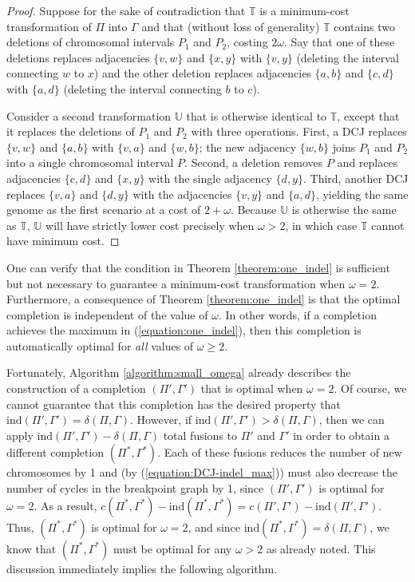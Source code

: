 \begin{proof}
Suppose for the sake of contradiction that $\mathbb{T}$ is a minimum-cost transformation of $\Pi$ into $\Gamma$ and that (without loss of generality) $\mathbb{T}$ contains two deletions of chromosomal intervals $P_1$ and $P_2$, costing $2\omega$.  Say that one of these deletions replaces adjacencies $\{v, w\}$ and $\{x, y\}$ with $\{v, y\}$ (deleting the interval connecting $w$ to $x$)  and the other deletion replaces adjacencies $\{a, b\}$ and $\{c, d\}$ with $\{a, d\}$ (deleting the interval connecting $b$ to $c$).

Consider a second transformation $\mathbb{U}$ that is otherwise identical to $\mathbb{T}$, except that it replaces the deletions of $P_1$ and $P_2$ with three operations.  First, a DCJ replaces $\{v, w\}$ and $\{a, b\}$ with $\{v, a\}$ and $\{w, b\}$; the new adjacency $\{w, b\}$ joins $P_1$ and $P_2$ into a single chromosomal interval $P$.  Second, a deletion removes $P$ and replaces adjacencies $\{c, d\}$ and $\{x, y\}$ with the single adjacency $\{d, y\}$.  Third, another DCJ replaces $\{v, a\}$ and $\{d, y\}$ with the adjacencies $\{v, y\}$ and $\{a, d\}$, yielding the same genome as the first scenario at a cost of $2 + \omega$.  Because $\mathbb{U}$ is otherwise the same as $\mathbb{T}$, $\mathbb{U}$ will have strictly lower cost precisely when $\omega > 2$, in which case $\mathbb{T}$ cannot have minimum cost.
\end{proof}

\noindent One can verify that the condition in Theorem \ref{theorem:one_indel} is sufficient but not necessary to guarantee a minimum-cost transformation when $\omega = 2$.  Furthermore, a consequence of Theorem \ref{theorem:one_indel} is that the optimal completion is independent of the value of $\omega$.  In other words, if a completion achieves the maximum in (\ref{equation:one_indel}), then this completion is automatically optimal for \emph{all} values of $\omega \geq 2$.

Fortunately, Algorithm \ref{algorithm:small_omega} already describes the construction of a completion $(\Pi', \Gamma')$ that is optimal when $\omega = 2$.  Of course, we cannot guarantee that this completion has the desired property that $\mathrm{ind}(\Pi', \Gamma') = \delta(\Pi, \Gamma)$.  However, if $\mathrm{ind}(\Pi', \Gamma') > \delta(\Pi, \Gamma)$, then we can apply $\mathrm{ind}(\Pi', \Gamma') - \delta(\Pi, \Gamma)$ total fusions to $\Pi'$ and $\Gamma'$ in order to obtain a different completion $(\Pi^{*}, \Gamma^{*})$.  Each of these fusions reduces the number of new chromosomes by 1 and (by (\ref{equation:DCJ-indel_max})) must also decrease the number of cycles in the breakpoint graph by 1, since $(\Pi', \Gamma')$ is optimal for $\omega = 2$. As a result, $c(\Pi^{*}, \Gamma^{*}) - \mathrm{ind}(\Pi^{*}, \Gamma^{*}) = c(\Pi', \Gamma') - \mathrm{ind}(\Pi', \Gamma')$.  Thus, $(\Pi^{*}, \Gamma^{*})$ is optimal for $\omega = 2$, and since $\mathrm{ind}(\Pi^{*}, \Gamma^{*}) = \delta(\Pi, \Gamma)$, we know that $(\Pi^{*}, \Gamma^{*})$ must be optimal for any $\omega > 2$ as already noted.  This discussion immediately implies the following algorithm.


